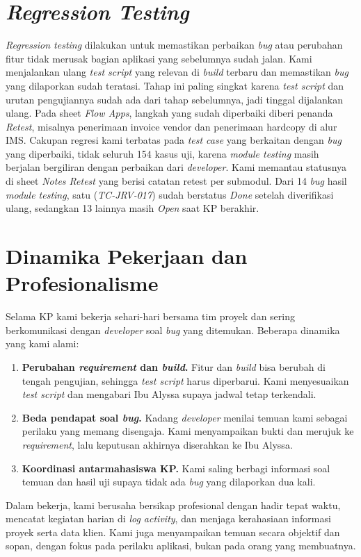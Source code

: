 \section{\textit{Regression Testing}}
\textit{Regression testing} dilakukan untuk memastikan perbaikan \textit{bug} atau perubahan fitur tidak merusak bagian aplikasi yang sebelumnya sudah jalan. Kami menjalankan ulang \textit{test script} yang relevan di \textit{build} terbaru dan memastikan \textit{bug} yang dilaporkan sudah teratasi. Tahap ini paling singkat karena \textit{test script} dan urutan pengujiannya sudah ada dari tahap sebelumnya, jadi tinggal dijalankan ulang. Pada sheet \textit{Flow Apps}, langkah yang sudah diperbaiki diberi penanda \textit{Retest}, misalnya penerimaan invoice vendor dan penerimaan hardcopy di alur IMS. Cakupan regresi kami terbatas pada \textit{test case} yang berkaitan dengan \textit{bug} yang diperbaiki, tidak seluruh 154 kasus uji, karena \textit{module testing} masih berjalan bergiliran dengan perbaikan dari \textit{developer}. Kami memantau statusnya di sheet \textit{Notes Retest} yang berisi catatan retest per submodul. Dari 14 \textit{bug} hasil \textit{module testing}, satu (\textit{TC-JRV-017}) sudah berstatus \textit{Done} setelah diverifikasi ulang, sedangkan 13 lainnya masih \textit{Open} saat KP berakhir.

\section{Dinamika Pekerjaan dan Profesionalisme}
Selama KP kami bekerja sehari-hari bersama tim proyek dan sering berkomunikasi dengan \textit{developer} soal \textit{bug} yang ditemukan. Beberapa dinamika yang kami alami:
\begin{enumerate}[label=\arabic*)]
\item \textbf{Perubahan \textit{requirement} dan \textit{build}.} Fitur dan \textit{build} bisa berubah di tengah pengujian, sehingga \textit{test script} harus diperbarui. Kami menyesuaikan \textit{test script} dan mengabari Ibu Alyssa supaya jadwal tetap terkendali.
\item \textbf{Beda pendapat soal \textit{bug}.} Kadang \textit{developer} menilai temuan kami sebagai perilaku yang memang disengaja. Kami menyampaikan bukti dan merujuk ke \textit{requirement}, lalu keputusan akhirnya diserahkan ke Ibu Alyssa.
\item \textbf{Koordinasi antarmahasiswa KP.} Kami saling berbagi informasi soal temuan dan hasil uji supaya tidak ada \textit{bug} yang dilaporkan dua kali.
\end{enumerate}
Dalam bekerja, kami berusaha bersikap profesional dengan hadir tepat waktu, mencatat kegiatan harian di \textit{log activity}, dan menjaga kerahasiaan informasi proyek serta data klien. Kami juga menyampaikan temuan secara objektif dan sopan, dengan fokus pada perilaku aplikasi, bukan pada orang yang membuatnya.


